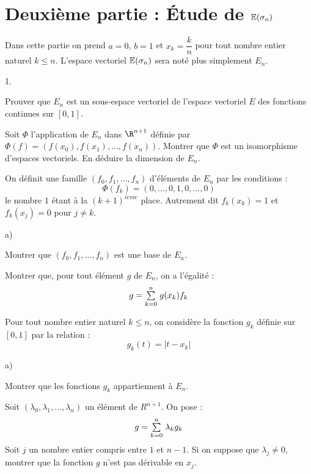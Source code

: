 \documentclass[11pt]{article}%
\begin{document}
\section*{Deuxième partie : {\protect\Large Étude de
$\mathbb{E}(\protect\sigma_{n})$}}

Dans cette partie on prend $a = 0$, $b = 1$ et $x_{k} = \dfrac{k}{n}$
pour tout
nombre entier naturel $k\leq n$. L'espace vectoriel $\mathbb{E}(\sigma_{n})$
sera noté plus simplement $E_{n}$.

\begin{noliste}{1.}
 \setlength{\itemsep}{4mm}
\item Prouver que $E_{n}$ est un sous-espace vectoriel de l'espace
vectoriel 
$E$ des fonctions continues sur $[0,1]$.

\item Soit $\Phi $ l'application de $E_{n}$ dans $\R^{n + 1}$ définie
par $\Phi (f) = (f(x_{0}),f(x_{1}),\ldots,f(x_{n}))$. Montrer que $\Phi
$ est
un isomorphisme d'espaces vectoriels. En déduire la dimension de
$E_{n}$.

\item On définit une famille $(f_{0},f_{1},\ldots,f_{n})$ d'éléments de
$E_{n}$ par les conditions : 
\[
\Phi (f_{k}) = (0,\ldots,0,1,0,\ldots,0)
\]
le nombre $1$ étant à la $(k + 1)^{i\grave{e}me}$ place. Autrement dit
$f_{k}(x_{k}) = 1$ et $f_{k}(x_{j}) = 0$ pour $j\neq k$.

\begin{noliste}{a)}
 \setlength{\itemsep}{2mm}
\item Montrer que $(f_{0},f_{1},\ldots,f_{n})$ est une base de $E_{n}$.

\item Montrer que, pour tout élément $g$ de $E_{n}$, on a l'égalité : 
\[
g = {\textstyle\sum\limits_{k = 0}^{n}}\hspace{.1cm}g(x_{k})f_{k}
\]
\end{noliste}

\item Pour tout nombre entier naturel $k\leq n$, on considère la
fonction $g_{k}$ définie sur $[0,1]$ par la relation : 
\[
g_{k}(t) = \left| t-x_{k}\right| 
\]

\begin{noliste}{a)}
 \setlength{\itemsep}{2mm}
\item Montrer que les fonctions $g_{k}$ appartiennent à $E_{n}$.

\item Soit $(\lambda_{0},\lambda_{1},\ldots,\lambda_{n})$ un élément de
$R^{n + 1}$. On pose : 
\[
g = {\textstyle\sum\limits_{k = 0}^{n}}\hspace{.1cm}\lambda_{k}g_{k}
\]
Soit $j$ un nombre entier compris entre $1$ et $n-1$. Si on suppose que
$\lambda_{j}\neq 0$, montrer que la fonction $g$ n'est pas dérivable en
$x_{j}$.
\end{noliste}


\end{noliste}
\end{document}
